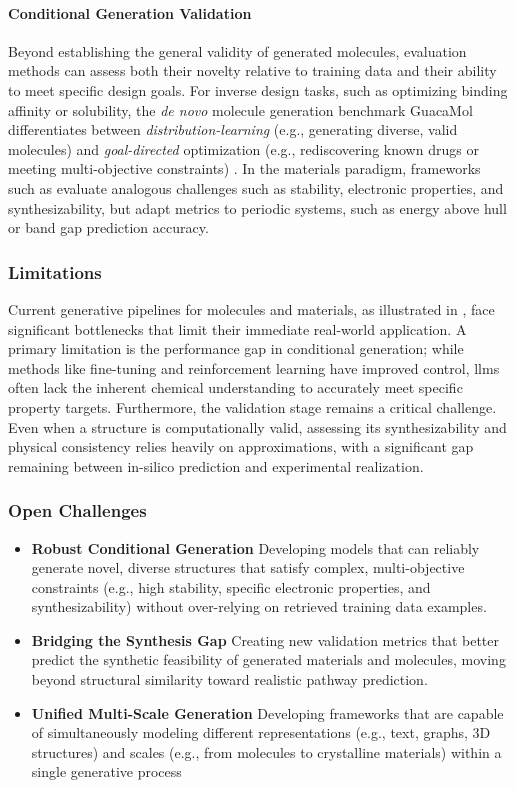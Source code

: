 \paragraph{Conditional Generation Validation} Beyond establishing the general validity of generated molecules, evaluation methods can assess both their novelty relative to training data and their ability to meet specific design goals. For inverse design tasks, such as optimizing binding affinity or solubility, the \textit{de novo} molecule generation benchmark GuacaMol differentiates between \textit{distribution-learning} (e.g., generating diverse, valid molecules) and \textit{goal-directed} optimization (e.g., rediscovering known drugs or meeting multi-objective constraints) \autocite{brown2019guacamol}. 
In the materials paradigm, frameworks such as  evaluate analogous challenges such as stability, electronic properties, and synthesizability, but adapt metrics to periodic systems, such as energy above hull or band gap prediction accuracy\autocite{riebesell2025framework}. 

\subsubsection{Limitations}
Current generative pipelines for molecules and materials, as illustrated in , face significant bottlenecks that limit their immediate real-world application. A primary limitation is the performance gap in conditional generation; while methods like fine-tuning and reinforcement learning have improved control, \glspl{llm} often lack the inherent chemical understanding to accurately meet specific property targets. Furthermore, the validation stage remains a critical challenge. Even when a structure is computationally valid, assessing its synthesizability and physical consistency relies heavily on approximations, with a significant gap remaining between in-silico prediction and experimental realization.

\subsubsection{Open Challenges}
\begin{itemize}
    \item \textbf{Robust Conditional Generation} Developing models that can reliably generate novel, diverse structures that satisfy complex, multi-objective constraints (e.g., high stability, specific electronic properties, and synthesizability) without over-relying on retrieved training data examples.
    \item \textbf{Bridging the Synthesis Gap} Creating new validation metrics that better predict the synthetic feasibility of generated materials and molecules, moving beyond structural similarity toward realistic pathway prediction.
    \item \textbf{Unified Multi-Scale Generation} Developing frameworks that are capable of simultaneously modeling different representations (e.g., text, graphs, 3D structures) and scales (e.g., from molecules to crystalline materials) within a single generative process
 \end{itemize}


